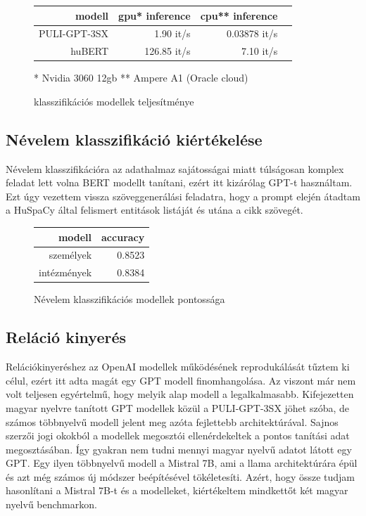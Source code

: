 \begin{figure}[H]
	\centering
	\begin{tabular}{rrrr}
		modell & gpu* inference & cpu** inference \\ \hline
		PULI-GPT-3SX & 1.90 it/s & 0.03878 it/s \\
		huBERT & 126.85 it/s & 7.10 it/s \\
	\end{tabular}
	\caption{klasszifikációs modellek teljesítménye}{
		* Nvidia 3060 12gb
		** Ampere A1 (Oracle cloud)}
\end{figure}

\subsection{Névelem klasszifikáció kiértékelése}

Névelem klasszifikációra az adathalmaz sajátosságai miatt túlságosan komplex feladat lett volna BERT modellt tanítani, ezért itt kizárólag GPT-t használtam. Ezt úgy vezettem vissza szöveggenerálási feladatra, hogy a prompt elején átadtam a HuSpaCy által felismert entitások listáját és utána a cikk szövegét.

\begin{figure}[H]
	\centering
	\begin{tabular}{rr}
		modell & accuracy \\ \hline
		személyek & 0.8523 \\
		intézmények & 0.8384 \\
	\end{tabular}
	\caption{Névelem klasszifikációs modellek pontossága}
\end{figure}


\subsection{Reláció kinyerés}

Relációkinyeréshez az OpenAI modellek működésének reprodukálását tűztem ki célul, ezért itt adta magát egy GPT modell finomhangolása. Az viszont már nem volt teljesen egyértelmű, hogy melyik alap modell a legalkalmasabb. Kifejezetten magyar nyelvre tanított GPT modellek közül a PULI-GPT-3SX jöhet szóba, de számos többnyelvű modell jelent meg azóta fejlettebb architektúrával. Sajnos szerzői jogi okokból a modellek megosztói ellenérdekeltek a pontos tanítási adat megosztásában. Így gyakran nem tudni mennyi magyar nyelvű adatot látott egy GPT. Egy ilyen többnyelvű modell a Mistral 7B, ami a llama architektúrára épül és azt még számos új módszer beépítésével tökéletesíti. Azért, hogy össze tudjam hasonlítani a Mistral 7B-t és a modelleket, kiértékeltem mindkettőt két magyar nyelvű benchmarkon.

